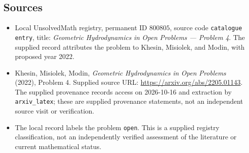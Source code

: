 \documentclass[11pt]{article}
\begin{document}
\subsection{Sources}
\begin{itemize}
\item Local UnsolvedMath registry, permanent ID \(800805\), source code \texttt{catalogue entry}, title: \emph{Geometric Hydrodynamics in Open Problems --- Problem 4}. The supplied record attributes the problem to Khesin, Misiolek, and Modin, with proposed year 2022.
\item Khesin, Misiolek, Modin, \emph{Geometric Hydrodynamics in Open Problems} (2022), Problem 4. Supplied source URL: \url{https://arxiv.org/abs/2205.01143}. The supplied provenance records access on 2026-10-16 and extraction by \texttt{arxiv\_latex}; these are supplied provenance statements, not an independent source visit or verification.
\item The local record labels the problem \texttt{open}. This is a supplied registry classification, not an independently verified assessment of the literature or current mathematical status.
\end{itemize}
\end{document}
